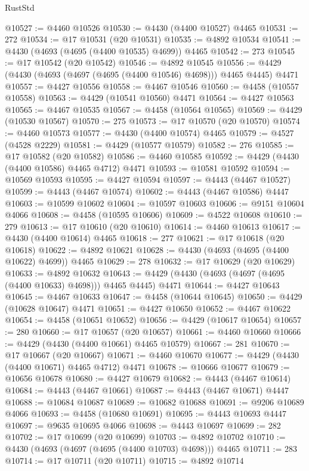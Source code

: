 \begin{lexlean}{RustStd}
\begin{coremodule}
@10527 := @4460 @10526
@10530 := @4430 (@4400 @10527) @4465
@10531 := 272
@10534 := @17 @10531 (@20 @10531)
@10535 := @4892 @10534
@10541 := @4430 (@4693 (@4695 (@4400 @10535) @4699)) @4465
@10542 := 273
@10545 := @17 @10542 (@20 @10542)
@10546 := @4892 @10545
@10556 := @4429 (@4430 (@4693 (@4697 (@4695 (@4400 @10546) @4698))) @4465 @4445) @4471
@10557 := @4427 @10556
@10558 := @4467 @10546
@10560 := @4458 (@10557 @10558)
@10563 := @4429 (@10541 @10560) @4471
@10564 := @4427 @10563
@10565 := @4467 @10535
@10567 := @4458 (@10564 @10565)
@10569 := @4429 (@10530 @10567)
@10570 := 275
@10573 := @17 @10570 (@20 @10570)
@10574 := @4460 @10573
@10577 := @4430 (@4400 @10574) @4465
@10579 := @4527 (@4528 @2229)
@10581 := @4429 (@10577 @10579)
@10582 := 276
@10585 := @17 @10582 (@20 @10582)
@10586 := @4460 @10585
@10592 := @4429 (@4430 (@4400 @10586) @4465 @4712) @4471
@10593 := @10581 @10592
@10594 := @10569 @10593
@10595 := @4427 @10594
@10597 := @4443 (@4467 @10527)
@10599 := @4443 (@4467 @10574)
@10602 := @4443 (@4467 @10586) @4447
@10603 := @10599 @10602
@10604 := @10597 @10603
@10606 := @9151 @10604 @4066
@10608 := @4458 (@10595 @10606)
@10609 := @4522 @10608
@10610 := 279
@10613 := @17 @10610 (@20 @10610)
@10614 := @4460 @10613
@10617 := @4430 (@4400 @10614) @4465
@10618 := 277
@10621 := @17 @10618 (@20 @10618)
@10622 := @4892 @10621
@10628 := @4430 (@4693 (@4695 (@4400 @10622) @4699)) @4465
@10629 := 278
@10632 := @17 @10629 (@20 @10629)
@10633 := @4892 @10632
@10643 := @4429 (@4430 (@4693 (@4697 (@4695 (@4400 @10633) @4698))) @4465 @4445) @4471
@10644 := @4427 @10643
@10645 := @4467 @10633
@10647 := @4458 (@10644 @10645)
@10650 := @4429 (@10628 @10647) @4471
@10651 := @4427 @10650
@10652 := @4467 @10622
@10654 := @4458 (@10651 @10652)
@10656 := @4429 (@10617 @10654)
@10657 := 280
@10660 := @17 @10657 (@20 @10657)
@10661 := @4460 @10660
@10666 := @4429 (@4430 (@4400 @10661) @4465 @10579)
@10667 := 281
@10670 := @17 @10667 (@20 @10667)
@10671 := @4460 @10670
@10677 := @4429 (@4430 (@4400 @10671) @4465 @4712) @4471
@10678 := @10666 @10677
@10679 := @10656 @10678
@10680 := @4427 @10679
@10682 := @4443 (@4467 @10614)
@10684 := @4443 (@4467 @10661)
@10687 := @4443 (@4467 @10671) @4447
@10688 := @10684 @10687
@10689 := @10682 @10688
@10691 := @9206 @10689 @4066
@10693 := @4458 (@10680 @10691)
@10695 := @4443 @10693 @4447
@10697 := @9635 @10695 @4066
@10698 := @4443 @10697
@10699 := 282
@10702 := @17 @10699 (@20 @10699)
@10703 := @4892 @10702
@10710 := @4430 (@4693 (@4697 (@4695 (@4400 @10703) @4698))) @4465
@10711 := 283
@10714 := @17 @10711 (@20 @10711)
@10715 := @4892 @10714

\end{coremodule}
\end{lexlean}
